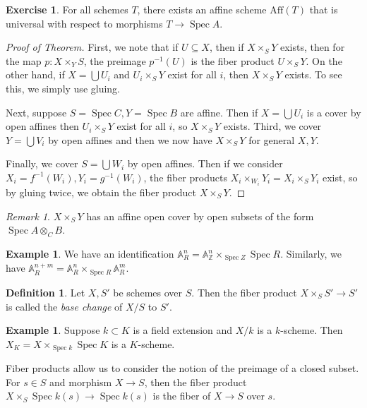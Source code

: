 \documentclass[leqno, openany]{memoir}
\theoremstyle{definition}
\newtheorem{defn}[thm]{Definition}
\newtheorem{exm}[thm]{Example}
\newtheorem{exer}[thm]{Exercise}
\theoremstyle{remark}
\newtheorem{rmk}[thm]{Remark}
\theoremstyle{plain}
\theoremstyle{definition}
\theoremstyle{remark}
\newcommand{\A}{\mathbb{A}}
\newcommand{\Z}{\mathbb{Z}}
\newcommand{\mr}[1]{\mathrm{#1}}
\DeclareMathOperator{\Spec}{Spec}
\begin{document}
\begin{exer}
    For all schemes $T$, there exists an affine scheme $\mr{Aff}(T)$ that is universal with respect to morphisms $T \to \Spec A$.
\end{exer}


\begin{proof}[Proof of Theorem]
    First, we note that if $U \subseteq X$, then if $X \times_S Y$ exists, then for the map $p \colon X \times_Y S$, the preimage $p^{-1}(U)$ is the fiber product $U \times_S Y$. On the other hand, if $X = \bigcup U_i$ and $U_i \times_S Y$ exist for all $i$, then $X \times_S Y$ exists. To see this, we simply use gluing. 

    Next, suppose $S = \Spec C, Y = \Spec B$ are affine. Then if $X = \bigcup U_i$ is a cover by open affines then $U_i \times_S Y$ exist for all $i$, so $X \times_S Y$ exists. Third, we cover $Y = \bigcup V_i$ by open affines and then we now have $X \times_S Y$ for general $X,Y$.

    Finally, we cover $S = \bigcup W_i$ by open affines. Then if we consider $X_i = f^{-1}(W_i), Y_i = g^{-1}(W_i)$, the fiber products $X_i \times_{W_i} Y_i = X_i \times_S Y_i$ exist, so by gluing twice, we obtain the fiber product $X \times_S Y$.
\end{proof}

\begin{rmk}
    $X \times_S Y$ has an affine open cover by open subsets of the form $\Spec A \otimes_C B$.
\end{rmk}

\begin{exm}
    We have an identification $\A_R^n = \A_{\Z}^n \times_{\Spec Z} \Spec R$. Similarly, we have $\A_R^{n+m} = \A_R^n \times_{\Spec R} \A_R^m$.
\end{exm}

\begin{defn}
    Let $X, S'$ be schemes over $S$. Then the fiber product $X \times_S S' \to S'$ is called the \textit{base change} of $X/S$ to $S'$. 
\end{defn}

\begin{exm}
    Suppose $k \subset K$ is a field extension and $X/k$ is a $k$-scheme. Then $X_K = X \times_{\Spec k} \Spec K$ is a $K$-scheme.
\end{exm}

Fiber products allow us to consider the notion of the preimage of a closed subset. For $s \in S$ and morphism $X \to S$, then the fiber product $X \times_S \Spec k(s) \to \Spec k(s)$ is the fiber of $X \to S$ over $s$.
\end{document}
